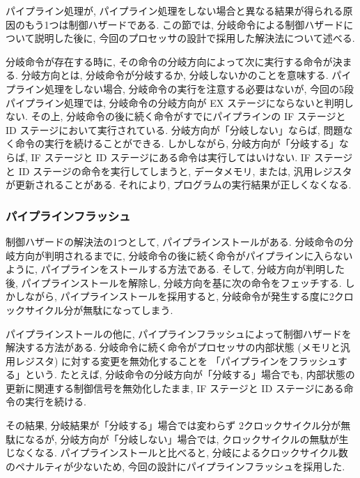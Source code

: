 \documentclass[../specifications.tex]{subfiles}
\begin{document}
  パイプライン処理が, 
  パイプライン処理をしない場合と異なる結果が得られる原因のもう1つは制御ハザードである.
  この節では, 分岐命令による制御ハザードについて説明した後に, 
  今回のプロセッサの設計で採用した解決法について述べる.

  分岐命令が存在する時に, その命令の分岐方向によって次に実行する命令が決まる.
  分岐方向とは, 分岐命令が分岐するか, 分岐しないかのことを意味する.
  パイプライン処理をしない場合, 分岐命令の実行を注意する必要はないが, 
  今回の5段パイプライン処理では, 分岐命令の分岐方向が EX ステージにならないと判明しない.
  その上, 分岐命令の後に続く命令がすでにパイプラインの IF ステージと ID ステージにおいて実行されている.
  分岐方向が「分岐しない」ならば, 問題なく命令の実行を続けることができる.
  しかしながら, 分岐方向が「分岐する」ならば, IF ステージと ID ステージにある命令は実行してはいけない.
  IF ステージと ID ステージの命令を実行してしまうと, データメモリ, または, 汎用レジスタが更新されることがある.
  それにより, プログラムの実行結果が正しくなくなる.

  \subsubsection{パイプラインフラッシュ}
  制御ハザードの解決法の1つとして, パイプラインストールがある.
  分岐命令の分岐方向が判明されるまでに, 分岐命令の後に続く命令がパイプラインに入らないように, 
  パイプラインをストールする方法である.
  そして, 分岐方向が判明した後, パイプラインストールを解除し, 
  分岐方向を基に次の命令をフェッチする.
  しかしながら, パイプラインストールを採用すると, 
  分岐命令が発生する度に2クロックサイクル分が無駄になってしまう.

  パイプラインストールの他に, パイプラインフラッシュによって制御ハザードを解決する方法がある.
  分岐命令に続く命令がプロセッサの内部状態 (メモリと汎用レジスタ) に対する変更を無効化することを
  「パイプラインをフラッシュする」という.
  たとえば, 分岐命令の分岐方向が「分岐する」場合でも, 
  内部状態の更新に関連する制御信号を無効化したまま, 
  IF ステージと ID ステージにある命令の実行を続ける.

  その結果, 分岐結果が「分岐する」場合では変わらず 2クロックサイクル分が無駄になるが, 
  分岐方向が「分岐しない」場合では, クロックサイクルの無駄が生じなくなる.
  パイプラインストールと比べると, 分岐によるクロックサイクル数のペナルティが少ないため, 
  今回の設計にパイプラインフラッシュを採用した.
\end{document}
